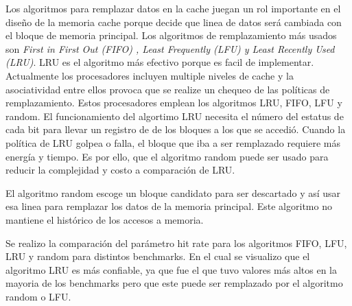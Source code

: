 Los algoritmos para remplazar datos en la cache juegan un rol importante en el diseño de la memoria cache porque decide que linea de datos será cambiada con el bloque de memoria principal. Los algoritmos de remplazamiento más usados son \textit{First in First Out (FIFO) , Least Frequently (LFU) y Least Recently Used (LRU)}. LRU es el algoritmo más efectivo porque es facil de implementar. Actualmente los procesadores incluyen multiple niveles de cache y la asociatividad entre ellos provoca que se realize un chequeo de las políticas de remplazamiento. Estos procesadores emplean los algoritmos LRU, FIFO, LFU y random. El funcionamiento del algortimo LRU necesita el número del estatus de cada bit para llevar un registro de de los bloques a los que se accedió. Cuando la política de LRU golpea o falla, el bloque que iba a ser remplazado requiere más energía y tiempo. Es por ello, que el algoritmo random puede ser usado para reducir la complejidad y costo a comparación de LRU.

El algoritmo random escoge un bloque candidato para ser descartado y así usar esa linea para remplazar los datos de la memoria principal. Este algoritmo no mantiene el histórico de los accesos a memoria.

Se realizo la comparación del parámetro hit rate para los algoritmos FIFO, LFU, LRU y random para distintos benchmarks. En el cual se visualizo que el algoritmo LRU es más confiable, ya que fue el que tuvo valores más altos en la mayoria de los benchmarks pero que este puede ser remplazado por el algoritmo random o LFU.
